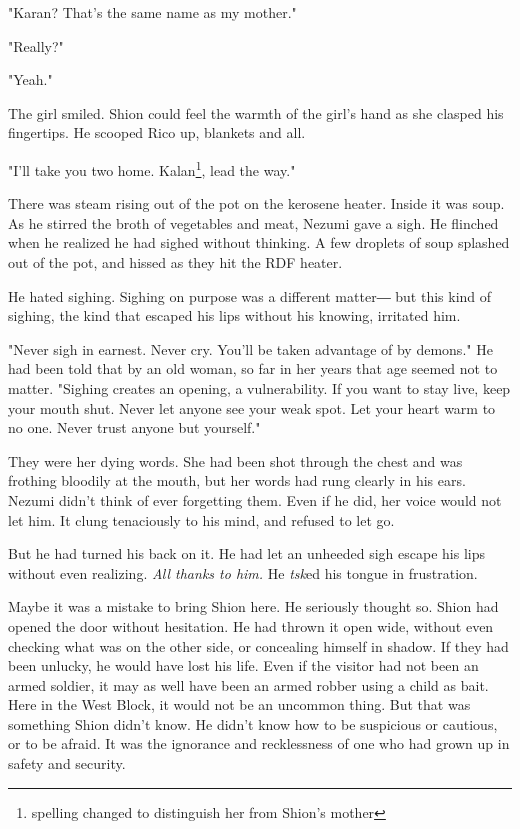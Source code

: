 "Karan? That's the same name as my mother."

"Really?"

"Yeah."

The girl smiled. Shion could feel the warmth of the girl's hand as she
clasped his fingertips. He scooped Rico up, blankets and all.

"I'll take you two home. Kalan\footnote{spelling changed to distinguish her from Shion's mother}, lead the way."

\myspace

There was steam rising out of the pot on the kerosene heater. Inside it
was soup. As he stirred the broth of vegetables and meat, Nezumi gave a
sigh. He flinched when he realized he had sighed without thinking. A few
droplets of soup splashed out of the pot, and hissed as they hit the RDF
heater.

He hated sighing. Sighing on purpose was a different matter― but this
kind of sighing, the kind that escaped his lips without his knowing,
irritated him.

"Never sigh in earnest. Never cry. You'll be taken advantage of by
demons." He had been told that by an old woman, so far in her years that
age seemed not to matter. "Sighing creates an opening, a vulnerability.
If you want to stay live, keep your mouth shut. Never let anyone see
your weak spot. Let your heart warm to no one. Never trust anyone but
yourself."

They were her dying words. She had been shot through the chest and was
frothing bloodily at the mouth, but her words had rung clearly in his
ears. Nezumi didn't think of ever forgetting them. Even if he did, her
voice would not let him. It clung tenaciously to his mind, and refused
to let go.

But he had turned his back on it. He had let an unheeded sigh escape his
lips without even realizing. \emph{All thanks to him.} He \emph{tsk}ed his tongue in
frustration.

Maybe it was a mistake to bring Shion here. He seriously thought so.
Shion had opened the door without hesitation. He had thrown it open
wide, without even checking what was on the other side, or concealing
himself in shadow. If they had been unlucky, he would have lost his
life. Even if the visitor had not been an armed soldier, it may as well
have been an armed robber using a child as bait. Here in the West Block,
it would not be an uncommon thing. But that was something Shion didn't
know. He didn't know how to be suspicious or cautious, or to be afraid.
It was the ignorance and recklessness of one who had grown up in safety
and security.

